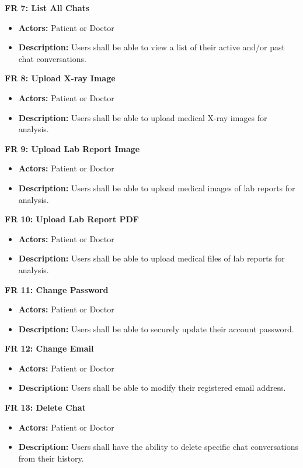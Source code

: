 \textbf{FR 7: List All Chats}
\begin{itemize}
    \item \textbf{Actors:} Patient or Doctor
    \item \textbf{Description:} Users shall be able to view a list of their active and/or past chat conversations.
\end{itemize} 


\textbf{FR 8: Upload X-ray Image} 
\begin{itemize}
    \item \textbf{Actors:} Patient or Doctor
    \item \textbf{Description:} Users shall be able to upload medical X-ray images for analysis.
\end{itemize}

\textbf{FR 9: Upload Lab Report Image} 
\begin{itemize}
    \item \textbf{Actors:} Patient or Doctor
    \item \textbf{Description:} Users shall be able to upload medical images of lab reports for analysis.
\end{itemize}

\textbf{FR 10: Upload Lab Report PDF} 
\begin{itemize}
    \item \textbf{Actors:} Patient or Doctor
    \item \textbf{Description:} Users shall be able to upload medical files of lab reports for analysis.
\end{itemize}


\textbf{FR 11: Change Password}
\begin{itemize}
    \item \textbf{Actors:} Patient or Doctor
    \item \textbf{Description:} Users shall be able to securely update their account password. 
\end{itemize}

\textbf{FR 12: Change Email}
\begin{itemize}
    \item \textbf{Actors:} Patient or Doctor
    \item \textbf{Description:} Users shall be able to modify their registered email address.
\end{itemize}

\textbf{FR 13: Delete Chat} 
\begin{itemize}
    \item \textbf{Actors:} Patient or Doctor
    \item \textbf{Description:}  Users shall have the ability to delete specific chat conversations from their history.
\end{itemize}

